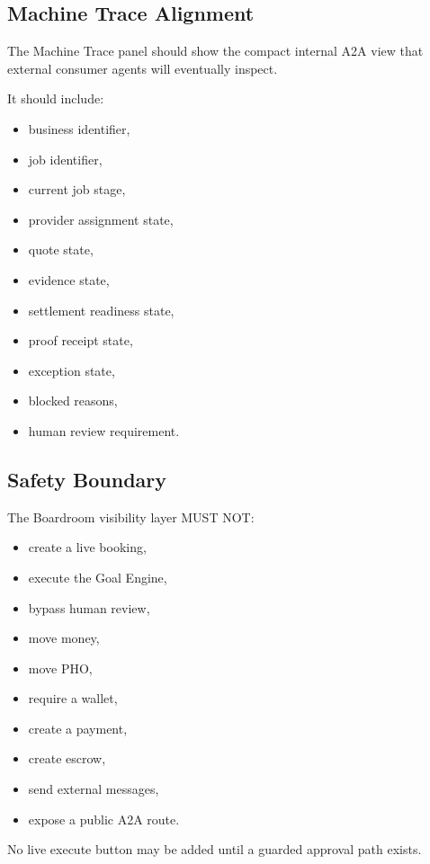 \subsection{Machine Trace Alignment}

The Machine Trace panel should show the compact internal A2A view that external consumer agents will eventually inspect.

It should include:

\begin{itemize}
  \item business identifier,
  \item job identifier,
  \item current job stage,
  \item provider assignment state,
  \item quote state,
  \item evidence state,
  \item settlement readiness state,
  \item proof receipt state,
  \item exception state,
  \item blocked reasons,
  \item human review requirement.
\end{itemize}

\subsection{Safety Boundary}

The Boardroom visibility layer MUST NOT:

\begin{itemize}
  \item create a live booking,
  \item execute the Goal Engine,
  \item bypass human review,
  \item move money,
  \item move PHO,
  \item require a wallet,
  \item create a payment,
  \item create escrow,
  \item send external messages,
  \item expose a public A2A route.
\end{itemize}

No live execute button may be added until a guarded approval path exists.

